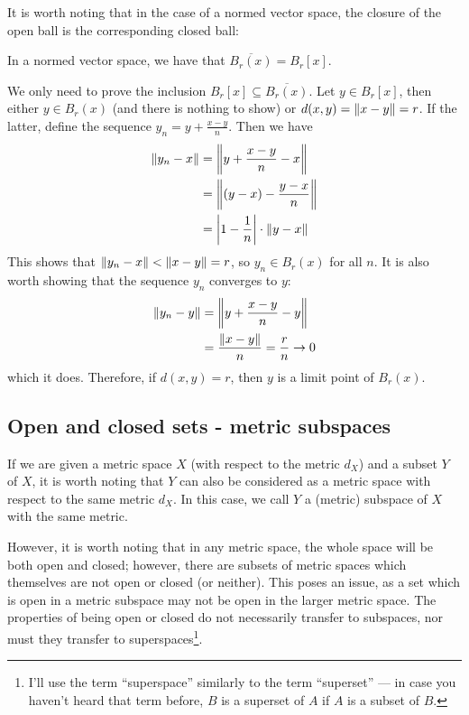 It is worth noting that in the case of a normed vector space, the closure of the open ball is the corresponding closed ball:
\begin{bprop}{}{}
In a normed vector space, we have that $\overline{B_{r}(x)} = B_{r}[x]$.
\end{bprop}
\begin{bproof}{}{}
We only need to prove the inclusion $B_{r}[x] \subseteq \overline{B_{r}(x)}$. Let $y\in B_{r}[x]$, then either $y\in B_{r}(x)$ (and there is nothing to show) or $d(x,y) = \left\lVert x-y \right\rVert = r$. If the latter, define the sequence $y_{n} = y + \frac{x-y}{n}$. Then we have
\begin{equation*}
\begin{split}
    \left\lVert y_{n} - x \right\rVert &= \left\lVert y + \frac{x-y}{n} - x \right\rVert \\
    &= \left\lVert (y-x) - \frac{y-x}{n} \right\rVert \\
    &= \left|1 - \frac{1}{n} \right| \cdot \left\lVert y-x \right\rVert \\
\end{split}
\end{equation*}
This shows that $\left\lVert y_{n} - x \right\rVert < \left\lVert x-y \right\rVert = r$, so $y_{n} \in B_{r}(x)$ for all $n$. It is also worth showing that the sequence $y_{n}$ converges to $y$:
\begin{equation*}
\begin{split}
    \left\lVert y_{n} - y \right\rVert &= \left\lVert y + \frac{x-y}{n} - y \right\rVert \\
     &= \frac{\left\lVert x-y \right\rVert}{n} = \frac{r}{n} \to 0
\end{split}
\end{equation*}
which it does. Therefore, if $d(x,y) = r$, then $y$ is a limit point of $B_{r}(x)$.
\eop
\end{bproof}
\subsection{Open and closed sets - metric subspaces}

If we are given a metric space $X$ (with respect to the metric $d_{X}$) and a subset $Y$ of $X$, it is worth noting that $Y$ can also be considered as a metric space with respect to the same metric $d_{X}$. In this case, we call $Y$ a (metric) subspace of $X$ with the same metric.

However, it is worth noting that in any metric space, the whole space will be both open and closed; however, there are subsets of metric spaces which themselves are not open or closed (or neither). This poses an issue, as a set which is open in a metric subspace may not be open in the larger metric space. The properties of being open or closed do not necessarily transfer to subspaces, nor must they transfer to superspaces\footnote{I'll use the term “superspace” similarly to the term “superset” — in case you haven't heard that term before, $B$ is a superset of $A$ if $A$ is a subset of $B$.}.

